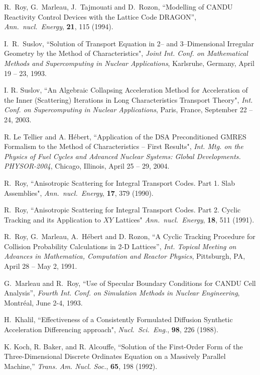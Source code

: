 \begin{thebibliography}{99}
 R.~Roy, G.~Marleau, J.~Tajmouati and D.~Rozon, ``Modelling of CANDU Reactivity
Control Devices with the Lattice Code DRAGON'', {\sl Ann.~nucl.~Energy}, {\bf
21}, 115 (1994).

I.~R.~Suslov, ``Solution of Transport Equation in 2-- and 3--Dimensional
Irregular Geometry by the Method of Characteristics", {\sl Joint Int. Conf. on
Mathematical Methods and Supercomputing in Nuclear Applications}, Karlsruhe,
Germany, April 19 -- 23, 1993.

I. R. Suslov, ``An Algebraic Collapsing Acceleration Method for Acceleration of the Inner (Scattering) Iterations in Long Characteristics Transport Theory",
{\sl Int. Conf. on Supercomputing in Nuclear Applications}, Paris, France, September 22 -- 24, 2003.

R. Le Tellier and A. H\'ebert, ``Application of the DSA Preconditioned GMRES Formalism to the Method of Characteristics -- First Results",
{\sl Int. Mtg. on the Physics of Fuel Cycles and Advanced Nuclear Systems:
Global Developments. PHYSOR-2004}, Chicago, Illinois, April 25 -- 29, 2004.

R.~Roy, ``Anisotropic Scattering for Integral Transport Codes. Part 1. Slab
Assemblies", {\sl Ann.~nucl.~Energy}, {\bf 17}, 379 (1990).

R.~Roy, ``Anisotropic Scattering for Integral Transport Codes. Part 2. Cyclic
Tracking and its Application to $XY$ Lattices" {\sl Ann.~nucl.~Energy}, {\bf
18}, 511 (1991).

R.~Roy, G.~Marleau, A.~H\'ebert and D. Rozon, ``A Cyclic Tracking Procedure for Collision
Probability Calculations in 2-D Lattices'', {\sl Int. Topical Meeting on
Advances in Mathematica, Computation and Reactor Physics}, Pittsburgh, PA, April
28 -- May 2, 1991. 

G.~Marleau and R.~Roy, ``Use of Specular Boundary Conditions for CANDU Cell
Analysis'',  {\sl Fourth Int. Conf. on Simulation Methods in Nuclear
Engineering}, Montr\'eal, June 2-4, 1993.

H.~Khalil, ``Effectiveness of a Consistently Formulated Diffusion Synthetic
Acceleration Differencing approach", {\sl Nucl.~Sci.~Eng.}, {\bf 98}, 226 (1988).

K. Koch, R. Baker, and R. Alcouffe, ``Solution of the First-Order Form of the Three-Dimensional Discrete Ordinates Equation on
a Massively Parallel Machine,'' {\sl Trans. Am. Nucl. Soc.}, {\bf 65}, 198 (1992). 


\end{thebibliography}
